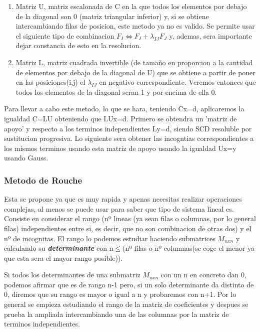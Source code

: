 \documentclass[11pt,a4paper]{article}
\begin{document}
\begin{enumerate}
\item Matriz U, matriz escalonada de C en la que todos los elementos por debajo de la diagonal son 0 (matriz triangular inferior) y, si se obtiene intercambiando filas de posicion, este metodo ya no es valido. Se permite usar el siguiente tipo de combinacion $F_I\Leftrightarrow F_I+\lambda_{IJ} F_J$ y, ademas, sera importante dejar constancia de esto en la resolucion.

\item Matriz L, matriz cuadrada invertible (de tamaño en proporcion a la cantidad de elementos por debajo de la diagonal de U) que se obtiene a partir de poner en las posiciones(i,j) el $\lambda_{IJ}$ en negativo correspondiente. Veremos entonces que todos los elementos de la diagonal seran 1 y por encima de ella 0.
\end{enumerate}

Para llevar a cabo este metodo, lo que se hara, teniendo Cx=d, aplicaremos la igualdad C=LU obteniendo que LUx=d. Primero se obtendra un 'matriz de apoyo' y respecto a los terminos independientes Ly=d, siendo SCD resoluble por sustitucion progresiva. Lo siguiente sera obtener las incogntias correspondientes a los mismos terminos usando esta matriz de apoyo usando la igualdad Ux=y usando Gauss.

\subsubsection{Metodo de Rouche}

Esta se propone ya que es muy rapida y apenas necesitas realizar operaciones complejas, al menos se puede usar para saber que tipo de sistema lineal es. Consiste en considerar el rango (nº lineas (ya sean filas o columnas, por lo general filas) independientes entre si, es decir, que no son combinacion de otras dos) y el nº de incognitas. El rango lo podemos estudiar haciendo submatrices $M_{nxn}$ y calculando su \textbf{\textit{determinante}} con n$\leq$(nº filas o nº columnas(se coge el menor ya que esta sera el mayor rango posible)). 

Si todos los determinantes de una submatriz $M_{nxn}$ con un n en concreto dan 0, podemos afirmar que es de rango n-1 pero, si un solo determinante da distinto de 0, diremos que su rango es mayor o igual a n y probaremos con n+1. Por lo general se empieza estudiando el rango de la matriz de coeficientes y despues se prueba la ampliada intercambiando una de las columnas por la matriz de terminos independientes.
\end{document}
